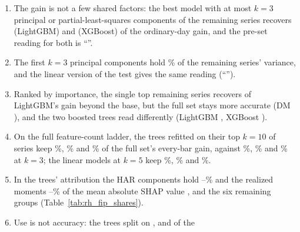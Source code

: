 \begin{enumerate}
  (LightGBM) and \rhabXgbBeyondRatioAll{} (XGBoost) times the full set's gain.
\item The gain is not a few shared factors: the best model with at most $k = 3$ principal or partial-least-squares
  components of the remaining series recovers \rhbyFLgbmBestShortOrdR{} (LightGBM) and \rhbyFXgbBestShortOrdR{}
  (XGBoost) of the ordinary-day gain, and the pre-set reading for both is ``\rhbyFLgbmReading''.
\item The first $k = 3$ principal components hold \rhbyFLShareCumThree\% of the remaining series' variance, and the
  linear version of the test gives the same reading (``\rhbyFLReading'').
\item Ranked by importance, the single top remaining series recovers \rhbyLLgbmKOneAllR{} of LightGBM's gain beyond
  the base, but the full set stays more accurate (DM \rhbyLLgbmKOneAllDmFull), and the two boosted trees read
  differently (LightGBM \rhbyLLgbmReading, XGBoost \rhbyLXgbReading).
\item On the full feature-count ladder, the trees refitted on their top $k = 10$ of \rhldNSeries{} series keep
  \rhldLgbmBarRTen\%, \rhldXgbBarRTen\% and \rhldRfBarRTen\% of the full set's every-bar gain, against
  \rhldLgbmBarRThree\%, \rhldXgbBarRThree\% and \rhldRfBarRThree\% at $k = 3$; the linear models at $k = 5$ keep
  \rhldRidgeBarRFive\%, \rhldLassoBarRFive\% and \rhldEnetBarRFive\%.
\item In the trees' attribution the HAR components hold \rhfipHarMin--\rhfipHarMax\% and the realized moments
  \rhfipMomMin--\rhfipMomMax\% of the mean absolute SHAP value \citep{lundberg2018consistent}, and the six remaining
  groups  (Table~\ref{tab:rh_fip_shares}).
\item Use is not accuracy: the trees split on \rhfipLgbmNUsedAll, \rhfipXgbNUsedAll{} and \rhfipRfNUsedAll{} of the

\end{enumerate}
